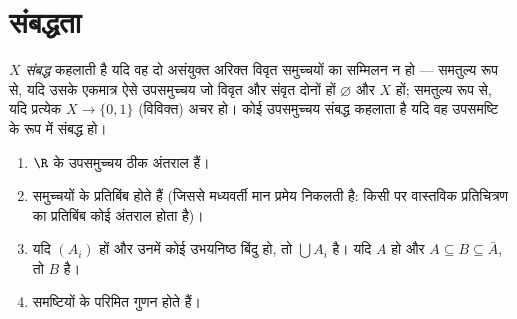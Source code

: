 \section{संबद्धता}

\begin{definition}\label{def:b3:topology:connected}
$X$ \emph{संबद्ध} कहलाती है यदि वह दो
असंयुक्त अरिक्त विवृत समुच्चयों का सम्मिलन न हो --- समतुल्य रूप
से, यदि उसके एकमात्र ऐसे उपसमुच्चय जो विवृत और संवृत दोनों हों
$\varnothing$ और $X$ हों; समतुल्य रूप से, यदि प्रत्येक 
$X \to \{0, 1\}$ (विविक्त) अचर हो। कोई उपसमुच्चय संबद्ध कहलाता है यदि वह
उपसमष्टि के रूप में संबद्ध हो।
\end{definition}

\begin{theorem}\label{thm:b3:topology:connectedbasics}
\begin{enumerate}
  \item $\R$ के  उपसमुच्चय ठीक अंतराल हैं।
  \item {} समुच्चयों के  प्रतिबिंब  होते हैं (जिससे
        मध्यवर्ती मान प्रमेय निकलती है: किसी  पर
         वास्तविक प्रतिचित्रण का प्रतिबिंब कोई अंतराल होता
        है)।
  \item यदि $(A_i)$  हों और उनमें कोई उभयनिष्ठ बिंदु हो, तो
        $\bigcup
        A_i$  है। यदि $A$  हो और $A \subseteq
        B \subseteq \bar A$, तो $B$
         है।
  \item {} समष्टियों के परिमित गुणन  होते हैं।
\end{enumerate}
\end{theorem}


